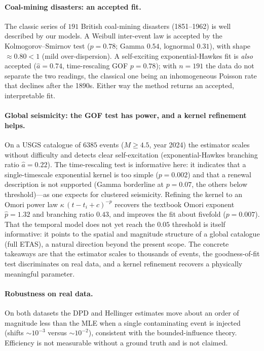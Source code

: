\documentclass[smallextended,natbib]{svjour3}
\begin{document}
\paragraph{Coal-mining disasters: an accepted fit.}
The classic series of $191$ British coal-mining disasters (1851--1962) is well
described by our models. A Weibull inter-event law is accepted by the
Kolmogorov--Smirnov test ($p=0.78$; Gamma $0.54$, lognormal $0.31$), with shape
$\approx0.80<1$ (mild over-dispersion). A self-exciting exponential-Hawkes fit is
\emph{also} accepted ($\hat a=0.74$, time-rescaling GOF $p=0.78$); with $n=191$ the
data do not separate the two readings, the classical one being an inhomogeneous
Poisson rate that declines after the 1890s. Either way the method returns an
accepted, interpretable fit.

\paragraph{Global seismicity: the GOF test has power, and a kernel refinement helps.}
On a USGS catalogue of $6385$ events ($M\ge4.5$, year 2024) the estimator scales
without difficulty and detects clear self-excitation (exponential-Hawkes branching
ratio $\hat a=0.22$). The time-rescaling test is informative here: it indicates that a
single-timescale exponential kernel is too simple ($p=0.002$) and that a renewal
description is not supported (Gamma borderline at $p=0.07$, the others below
threshold)---as one expects for clustered seismicity. Refining the kernel to an Omori
power law $\kappa\,(t-t_i+c)^{-p}$ recovers the textbook Omori exponent $\hat p=1.32$
and branching ratio $0.43$, and improves the fit about fivefold ($p=0.007$). That the
temporal model does not yet reach the $0.05$ threshold is itself informative: it points
to the spatial and magnitude structure of a global catalogue (full ETAS), a natural
direction beyond the present scope. The concrete takeaways are that the estimator
scales to thousands of events, the goodness-of-fit test discriminates on real data, and
a kernel refinement recovers a physically meaningful parameter.

\paragraph{Robustness on real data.}
On both datasets the DPD and Hellinger estimates move about an order of magnitude
less than the MLE when a single contaminating event is injected (shifts $\sim10^{-3}$
versus $\sim10^{-2}$), consistent with the bounded-influence theory. Efficiency is
not measurable without a ground truth and is not claimed.
\end{document}
